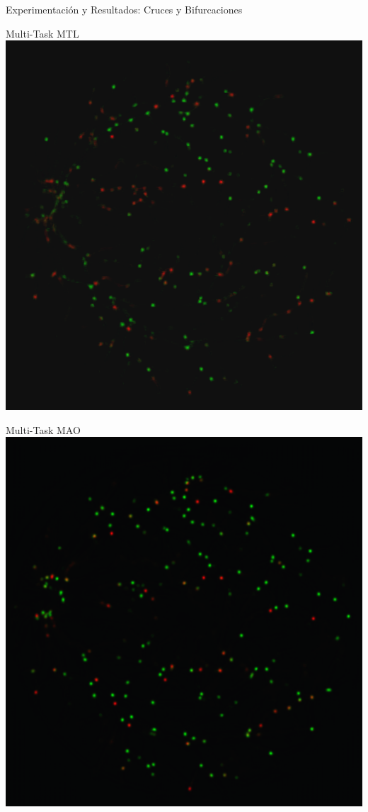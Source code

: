 \documentclass[xcolor=dvipsnames,table]{beamer}
\begin{document}
\begin{frame}{Experimentación y Resultados: Cruces y Bifurcaciones}
\begin{minipage}[b]{0.13\textwidth}
	\end{minipage}\hfill
	\begin{minipage}[b]{0.13\textwidth}
		\centering
		Multi-Task MTL\\[0.2cm]
		\includegraphics[width=\linewidth]{my_images/video/XBTASKMTL.jpg}
	\end{minipage}\hfill
	\begin{minipage}[b]{0.13\textwidth}
		\centering
		Multi-Task MAO\\[0.2cm]
		\includegraphics[width=\linewidth]{my_images/video/XBTASKMAO.jpg}

\end{minipage}
\end{frame}
\end{document}
